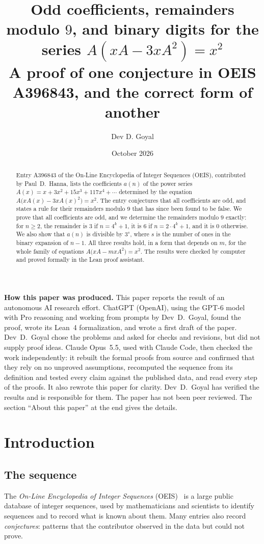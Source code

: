 \documentclass[11pt,a4paper]{article}
\title{Odd coefficients, remainders modulo $9$, and binary digits for the series $A(xA-3xA^2)=x^2$\\[6pt]\large A proof of one conjecture in OEIS A396843, and the correct form of another}
\author{Dev D. Goyal}
\date{October 2026}
\theoremstyle{definition}
\theoremstyle{remark}
\begin{document}
\maketitle
\begin{abstract}
Entry A396843 of the On-Line Encyclopedia of Integer Sequences (OEIS), contributed by Paul~D.~Hanna, lists the
coefficients $a(n)$ of the power series $A(x)=x+3x^2+15x^3+117x^4+\cdots$ determined by the equation
$A\bigl(xA(x)-3xA(x)^2\bigr)=x^2$. The entry conjectures that all coefficients are odd, and states a rule for their
remainders modulo $9$ that has since been found to be false. We prove that all coefficients are odd, and we determine
the remainders modulo $9$ exactly: for $n\ge2$, the remainder is $3$ if $n=4^k+1$, it is $6$ if $n=2\cdot4^k+1$, and it
is $0$ otherwise. We also show that $a(n)$ is divisible by $3^s$, where $s$ is the number of ones in the binary expansion
of $n-1$. All three results hold, in a form that depends on $m$, for the whole family of equations
$A\bigl(xA-mxA^2\bigr)=x^2$. The results were checked by computer and proved formally in the Lean proof assistant.
\end{abstract}
\begin{center}\begin{minipage}{0.88\linewidth}\small
\textbf{How this paper was produced.} This paper reports the result of an autonomous AI research effort.
ChatGPT (OpenAI), using the GPT-6 model with Pro reasoning and working from prompts by Dev~D.~Goyal, found the proof, wrote its Lean~4 formalization, and wrote a first draft of the paper.
Dev~D.~Goyal chose the problems and asked for checks and revisions, but did not supply proof ideas.
Claude Opus~5.5, used with Claude Code, then checked the work independently: it rebuilt the formal proofs from
source and confirmed that they rely on no unproved assumptions, recomputed the sequence from its definition and tested
every claim against the published data, and read every step of the proofs. It also rewrote this paper for clarity.
Dev~D.~Goyal has verified the results and is responsible for them. The paper has not been peer reviewed.
The section ``About this paper'' at the end gives the details.
\end{minipage}\end{center}

\section{Introduction}

\subsection{The sequence}\label{sec:sequence}
The \emph{On-Line Encyclopedia of Integer Sequences} (OEIS)~\cite{oeisdb} is a large public database of integer
sequences, used by mathematicians and scientists to identify sequences and to record what is known about them. Many
entries also record \emph{conjectures}: patterns that the contributor observed in the data but could not prove.
\end{document}
